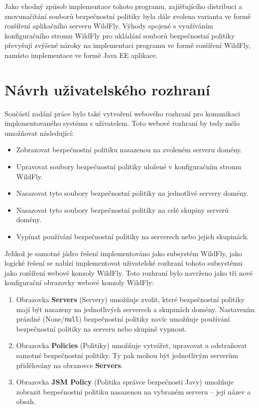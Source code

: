 Jako vhodný způsob implementace tohoto programu, zajišťujícího distribuci a znovunačítání souborů bezpečnostní politiky byla dále zvolena varianta ve formě rozšíření aplikačního serveru WildFly.
Výhody spojené s využíváním konfiguračního stromu WildFly pro ukládání souborů bezpečnostní politiky převyšují zvýšené nároky na implementaci programu ve formě rozšíření WildFly, namísto implementace ve formě Java EE aplikace.

\section{Návrh uživatelského rozhraní} \label{navrhGUI}

Součástí zadání práce bylo také vytvoření webového rozhraní pro komunikaci implementovaného systému s uživatelem.
Toto webové rozhraní by tedy mělo umožňovat následující:

\begin{itemize}
  \item Zobrazovat bezpečnostní politiku nasazenou na zvoleném serveru domény.
  \item Upravovat soubory bezpečnostní politiky uložené v konfiguračním stromu WildFly.
  \item Nasazovat tyto soubory bezpečnostní politiky na jednotlivé servery domény.
  \item Nasazovat tyto soubory bezpečnostní politiky na celé skupiny serverů domény.
  \item Vypínat používání bezpečnostní politiky na serverech nebo jejich skupinách.  
\end{itemize}

Jelikož je samotné jádro řešení implementováno jako subsystém WildFly, jako logické řešení se nabízí implementovat uživatelské rozhraní tohoto subsystému jako rozšíření webové konzoly WildFly.
Toto rozhraní bylo navrženo jako tři nové konfigurační obrazovky webové konzoly WildFly:

\begin{enumerate}
  \item Obrazovka {\bf Servers} (Servery) umožňuje zvolit, které bezpečnostní politiky mají být nasazeny na jednotlivých serverech a skupinách domény. Nastavením prázdné (None/{\tt null}) bezpečnostní politiky navíc umožňuje používání bezpečnostní politiky na serveru nebo skupině vypnout.
  \item Obrazovka {\bf Policies} (Politiky) umožňuje vytvářet, upravovat a odstraňovat samotné bezpečnostní politiky. Ty pak mohou být jednotlivým serverům přidělovány na obrazovce {\bf Servers}.
  \item Obrazovka {\bf JSM Policy} (Politika správce bezpečnosti Javy) umožňuje zobrazit bezpečnostní politiku nasazenou na vybraném serveru -- její název a obsah.
\end{enumerate}

